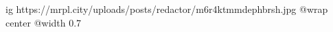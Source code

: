  
 
 
 
 

\ifcmt
  ig https://mrpl.city/uploads/posts/redactor/m6r4ktmmdephbrsh.jpg
  @wrap center
  @width 0.7
\fi
